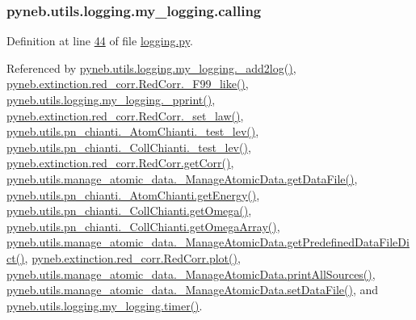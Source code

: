 \hypertarget{classpyneb_1_1utils_1_1logging_1_1my__logging_a38735db2b351731f0fb79d4a0eb231ab}{}
\subsubsection[{calling}]{\setlength{\rightskip}{0pt plus 5cm}pyneb.\+utils.\+logging.\+my\+\_\+logging.\+calling}\label{classpyneb_1_1utils_1_1logging_1_1my__logging_a38735db2b351731f0fb79d4a0eb231ab}


Definition at line \hyperlink{logging_8py_source_l00044}{44} of file \hyperlink{logging_8py_source}{logging.\+py}.



Referenced by \hyperlink{logging_8py_source_l00059}{pyneb.\+utils.\+logging.\+my\+\_\+logging.\+\_\+add2log()}, \hyperlink{red__corr_8py_source_l00658}{pyneb.\+extinction.\+red\+\_\+corr.\+Red\+Corr.\+\_\+\+F99\+\_\+like()}, \hyperlink{logging_8py_source_l00051}{pyneb.\+utils.\+logging.\+my\+\_\+logging.\+\_\+pprint()}, \hyperlink{red__corr_8py_source_l00176}{pyneb.\+extinction.\+red\+\_\+corr.\+Red\+Corr.\+\_\+set\+\_\+law()}, \hyperlink{pn__chianti_8py_source_l00284}{pyneb.\+utils.\+pn\+\_\+chianti.\+\_\+\+Atom\+Chianti.\+\_\+test\+\_\+lev()}, \hyperlink{pn__chianti_8py_source_l00449}{pyneb.\+utils.\+pn\+\_\+chianti.\+\_\+\+Coll\+Chianti.\+\_\+test\+\_\+lev()}, \hyperlink{red__corr_8py_source_l00211}{pyneb.\+extinction.\+red\+\_\+corr.\+Red\+Corr.\+get\+Corr()}, \hyperlink{manage__atomic__data_8py_source_l00297}{pyneb.\+utils.\+manage\+\_\+atomic\+\_\+data.\+\_\+\+Manage\+Atomic\+Data.\+get\+Data\+File()}, \hyperlink{pn__chianti_8py_source_l00346}{pyneb.\+utils.\+pn\+\_\+chianti.\+\_\+\+Atom\+Chianti.\+get\+Energy()}, \hyperlink{pn__chianti_8py_source_l00484}{pyneb.\+utils.\+pn\+\_\+chianti.\+\_\+\+Coll\+Chianti.\+get\+Omega()}, \hyperlink{pn__chianti_8py_source_l00461}{pyneb.\+utils.\+pn\+\_\+chianti.\+\_\+\+Coll\+Chianti.\+get\+Omega\+Array()}, \hyperlink{manage__atomic__data_8py_source_l00034}{pyneb.\+utils.\+manage\+\_\+atomic\+\_\+data.\+\_\+\+Manage\+Atomic\+Data.\+get\+Predefined\+Data\+File\+Dict()}, \hyperlink{red__corr_8py_source_l00303}{pyneb.\+extinction.\+red\+\_\+corr.\+Red\+Corr.\+plot()}, \hyperlink{manage__atomic__data_8py_source_l00431}{pyneb.\+utils.\+manage\+\_\+atomic\+\_\+data.\+\_\+\+Manage\+Atomic\+Data.\+print\+All\+Sources()}, \hyperlink{manage__atomic__data_8py_source_l00380}{pyneb.\+utils.\+manage\+\_\+atomic\+\_\+data.\+\_\+\+Manage\+Atomic\+Data.\+set\+Data\+File()}, and \hyperlink{logging_8py_source_l00115}{pyneb.\+utils.\+logging.\+my\+\_\+logging.\+timer()}.

